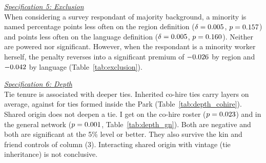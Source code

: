 \begin{table}[h!]
\centering
\caption{Specifications 2 to 4 - whether two workers are tied}
\label{tab:tie_formation}
\small
{}
\end{table}
\bigskip
\FloatBarrier

\noindent \underline{\textit{Specification 5: Exclusion}} \\[0.4em]
When considering a survey respondant of majority background, a minority is named \pnChanExclDeltaOutPp{} percentage points less often on the region definition ($\delta = 0.005{}$, $p = 0.157{}$) and \pnChanExclLangDeltaOutPp{} points less often on the language definition ($\delta = 0.005{}$, $p = 0.160{}$). Neither are powered nor significant. However, when the respondant is a minority worker herself, the penalty reverses into a significant premium of $-0.026{}$ by region and $-0.042{}$ by language (Table~\ref{tab:exclusion}). \\

\begin{table}[h!]
\centering
\caption{Specification 5 - whether a worker is refused}
\label{tab:exclusion}
\small
{}
\end{table}
\bigskip


\clearpage
{}

\noindent \underline{\textit{Specification 6: Depth}} \\[0.4em]
\noindent Tie tenure is associated with deeper ties. Inherited co-hire ties carry \pnMuxDepthCohireInh{} layers on average, against \pnMuxDepthCohireNew{} for ties formed inside the Park (Table~\ref{tab:depth_cohire}). \\[-0.6em]

\noindent Shared origin does not deepen a tie. I get \pnMuxOriginCohire{} on the co-hire roster ($p = 0.023{}$) and \pnMuxOriginGn{} in the general network ($p = 0.001{}$, Table~\ref{tab:depth_gn}). Both are negative and both are significant at the 5\% level or better. They also survive the kin and friend controls of column (3).  Interacting shared origin with vintage (tie inheritance) is not conclusive. \\[-0.6em]
 
